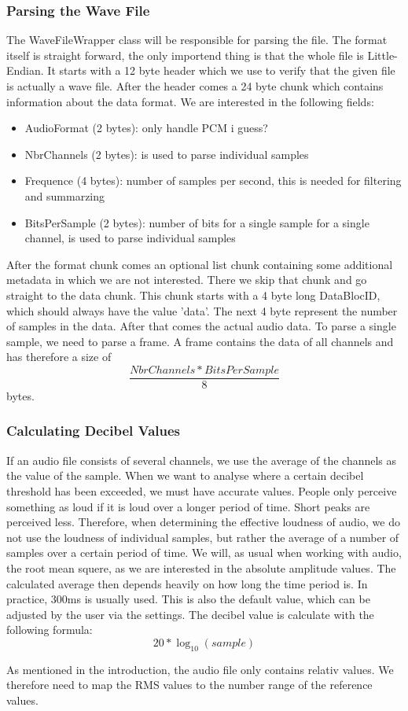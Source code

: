 \subsubsection{Parsing the Wave File}
The WaveFileWrapper class will be responsible for parsing the file. The format itself is straight forward\cite{wav_file_format_wikipedia}, the only importend thing is that the whole file is Little-Endian. It starts with a 12 byte header which we use to verify that the given file is actually a wave file. After the header comes a 24 byte chunk which contains information about the data format. We are interested in the following fields:
\begin{itemize}
    \item AudioFormat (2 bytes): only handle PCM i guess?
    \item NbrChannels (2 bytes): is used to parse individual samples
    \item Frequence (4 bytes): number of samples per second, this is needed for filtering and summarzing 
    \item BitsPerSample (2 bytes): number of bits for a single sample for a single channel, is used to parse individual samples
\end{itemize}
After the format chunk comes an optional list chunk containing some additional metadata in which we are not interested. There we skip that chunk and go straight to the data chunk. This chunk starts with a 4 byte long DataBlocID, which should always have the value 'data'. The next 4 byte represent the number of samples in the data. After that comes the actual audio data. To parse a single sample, we need to parse a frame. A frame contains the data of all channels and has therefore a size of \[\frac{NbrChannels * BitsPerSample}{8}\] bytes. 

\subsubsection{Calculating Decibel Values}
If an audio file consists of several channels, we use the average of the channels as the value of the sample.
When we want to analyse where a certain decibel threshold has been exceeded, we must have accurate values. People only perceive something as loud if it is loud over a longer period of time. Short peaks are perceived less. Therefore, when determining the effective loudness of audio, we do not use the loudness of individual samples, but rather the average of a number of samples over a certain period of time. We will, as usual when working with audio, the root mean squere, as we are interested in the absolute amplitude values.
The calculated average then depends heavily on how long the time period is. In practice, 300ms is usually used\cite{timespan_for_audio_rms_calculate}. This is also the default value, which can be adjusted by the user via the settings.
The decibel value is calculate with the following formula\cite{decibel_wikipedia}:
\[20 * \log_{10} (sample)\] 

As mentioned in the introduction, the audio file only contains relativ values. We therefore need to map the RMS values to the number range of the reference values.
